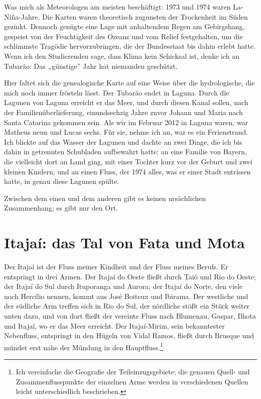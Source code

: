 \documentclass[
  ngerman,
  11pt,
  openany]{book}
\begin{document}
Was mich als Meteorologen am meisten beschäftigt: 1973 und 1974 waren
La-Niña-Jahre. Die Karten waren theoretisch zugunsten der Trockenheit im
Süden gezinkt. Dennoch genügte eine Lage mit anhaltendem Regen am
Gebirgshang, gespeist von der Feuchtigkeit des Ozeans und vom Relief
festgehalten, um die schlimmste Tragödie hervorzubringen, die der
Bundesstaat bis dahin erlebt hatte. Wenn ich den Studierenden sage, dass
Klima kein Schicksal ist, denke ich an Tubarão: Das „günstige'' Jahr hat
niemanden geschützt.

Hier faltet sich die genealogische Karte auf eine Weise über die
hydrologische, die mich noch immer frösteln lässt. Der Tubarão endet in
Laguna. Durch die Lagunen von Laguna erreicht er das Meer, und durch
diesen Kanal sollen, nach der Familienüberlieferung, einundsechzig Jahre
zuvor Johann und Maria nach Santa Catarina gekommen sein. Als wir im
Februar 2012 in Laguna waren, war Matheus neun und Lucas sechs. Für sie,
nehme ich an, war es ein Ferienstrand. Ich blickte auf das Wasser der
Lagunen und dachte an zwei Dinge, die ich bis dahin in getrennten
Schubladen aufbewahrt hatte: an eine Familie von Bayern, die vielleicht
dort an Land ging, mit einer Tochter kurz vor der Geburt und zwei
kleinen Kindern, und an einen Fluss, der 1974 alles, was er einer Stadt
entrissen hatte, in genau diese Lagunen spülte.

Zwischen dem einen und dem anderen gibt es keinen ursächlichen
Zusammenhang; es gibt nur den Ort.

\section{Itajaí: das Tal von Fata und
Mota}\label{itajauxed-das-tal-von-fata-und-mota}

Der Itajaí ist der Fluss meiner Kindheit und der Fluss meines Berufs. Er
entspringt in drei Armen. Der Itajaí do Oeste fließt durch Taió und Rio
do Oeste; der Itajaí do Sul durch Ituporanga und Aurora; der Itajaí do
Norte, den viele noch Hercílio nennen, kommt aus José Boiteux und
Ibirama. Der westliche und der südliche Arm treffen sich in Rio do Sul,
der nördliche stößt ein Stück weiter unten dazu, und von dort fließt der
vereinte Fluss nach Blumenau, Gaspar, Ilhota und Itajaí, wo er das Meer
erreicht. Der Itajaí-Mirim, sein bekanntester Nebenfluss, entspringt in
den Hügeln von Vidal Ramos, fließt durch Brusque und mündet erst nahe
der Mündung in den Hauptfluss.\footnote{Ich vereinfache die Geografie
  der Teileinzugsgebiete; die genauen Quell- und Zusammenflusspunkte der
  einzelnen Arme werden in verschiedenen Quellen leicht unterschiedlich
  beschrieben.}
\end{document}
